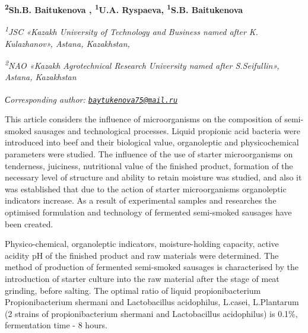 
\begin{articleheader}

{\bfseries
\textsuperscript{2}Sh.B. Baitukenova\textsuperscript{\envelope } \authorid,
\textsuperscript{1}U.A. Ryspaeva\authorid,
\textsuperscript{1}S.B. Baitukenova\authorid}
\end{articleheader}

\begin{affiliation}
\emph{\textsuperscript{1}JSC «Kazakh University of Technology and
Business named after K. Kulazhanov», Astana, Kazakhstan,}

\emph{\textsuperscript{2}NAO «Kazakh Agrotechnical Research University
named after S.Seifullin», Astana, Kazakhstan}

\raggedright {\bfseries \textsuperscript{\envelope }}{\em Сorresponding author: \href{mailto:baytukenova75@mail.ru}{\nolinkurl{baytukenova75@mail.ru}}}
\end{affiliation}

This article considers the influence of microorganisms on the
composition of semi-smoked sausages and technological processes. Liquid
propionic acid bacteria were introduced into beef and their biological
value, organoleptic and physicochemical parameters were studied. The
influence of the use of starter microorganisms on tenderness, juiciness,
nutritional value of the finished product, formation of the necessary
level of structure and ability to retain moisture was studied, and also
it was established that due to the action of starter microorganisms
organoleptic indicators increase. As a result of experimental samples
and researches the optimised formulation and technology of fermented
semi-smoked sausages have been created.

Physico-chemical, organoleptic indicators, moisture-holding capacity,
active acidity pH of the finished product and raw materials were
determined. The method of production of fermented semi-smoked sausages
is characterised by the introduction of starter culture into the raw
material after the stage of meat grinding, before salting. The optimal
ratio of liquid propionibacterium Propionibacterium shermani and
Lactobacillus acidophilus, L.casei, L.Plantarum (2 strains of
propionibacterium shermani and Lactobacillus acidophilus) is 0.1\%,
fermentation time - 8 hours.

